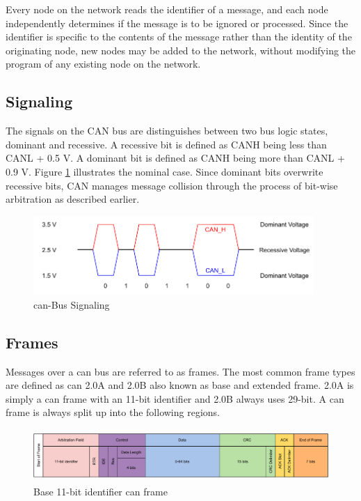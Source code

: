 Every node on the network reads the identifier of a message, and each node independently determines if the message is to be ignored or processed. Since the identifier is specific to the contents of the message rather than the identity of the originating node, new nodes may be added to the network, without modifying the program of any existing node on the network.

\subsection{Signaling}

The signals on the CAN bus are distinguishes between two bus logic states, dominant and recessive. A recessive bit is defined as CANH being less than CANL + 0.5 V. A dominant bit is defined as CANH being more than CANL + 0.9 V. Figure \ref{fig:can-signaling} illustrates the nominal case. Since dominant bits overwrite recessive bits, CAN manages message collision through the process of bit-wise arbitration as described earlier.

\begin{figure}[h!]
	\centering
	\includegraphics[height=3cm]{images/can-signaling}
	\caption{\acrshort{can}-Bus Signaling}
	\vspace{-1.4ex}
	\label{fig:can-signaling}
\end{figure}

\subsection{Frames}
Messages over a \acrshort{can} bus are referred to as frames. The most common frame types are defined as \acrshort{can} 2.0A and 2.0B also known as base and extended frame. 2.0A is simply a \acrshort{can} frame with an 11-bit identifier and 2.0B always uses 29-bit. A \acrshort{can} frame is always split up into the following regions.

\begin{figure}[h!]
	\centering
	\includegraphics[height=2cm]{images/can-frame}
	\caption{Base 11-bit identifier \acrshort{can} frame}
	\vspace{-1.4ex}
	\label{fig:can-frame}
\end{figure}

